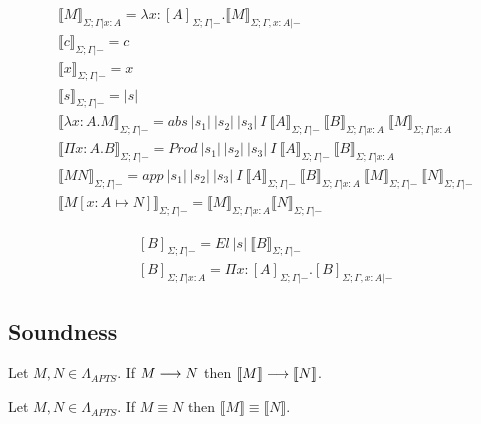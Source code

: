 \documentclass[]{StandardTemplate}
\begin{document}
\begin{align*}
  &\llbracket M \rrbracket_{\Sigma; \Gamma |x : A} = \lambda x : [ A ]_{\Sigma; \Gamma |-}. \llbracket M \rrbracket_{\Sigma; \Gamma, x : A |-}\\
  &\llbracket c \rrbracket_{\Sigma; \Gamma |-} = c\\
  &\llbracket x \rrbracket_{\Sigma; \Gamma |-} = x\\
  &\llbracket s \rrbracket_{\Sigma; \Gamma |-} = |s|\\
  &\llbracket \lambda x : A. M \rrbracket_{\Sigma; \Gamma |-} = abs~|s_1|~|s_2|~|s_3|~I~\llbracket A \rrbracket_{\Sigma; \Gamma |-}~\llbracket B \rrbracket_{\Sigma; \Gamma |x : A}~\llbracket M \rrbracket_{\Sigma; \Gamma |x : A}\\
  &\llbracket \Pi x : A. B \rrbracket_{\Sigma; \Gamma |-} = Prod~|s_1|~|s_2|~|s_3|~I~\llbracket A \rrbracket_{\Sigma; \Gamma |-}~\llbracket B \rrbracket_{\Sigma; \Gamma |x:A}\\
  &\llbracket M N \rrbracket_{\Sigma; \Gamma |-} = app~|s_1|~|s_2|~|s_3|~I~\llbracket A \rrbracket_{\Sigma; \Gamma |-}~\llbracket B \rrbracket_{\Sigma; \Gamma |x : A}~\llbracket M \rrbracket_{\Sigma; \Gamma |-}~\llbracket N \rrbracket_{\Sigma; \Gamma |-}\\
  &\llbracket M[x : A \mapsto N]\rrbracket_{\Sigma; \Gamma |-} = \llbracket M \rrbracket_{\Sigma; \Gamma |x : A}\llbracket N \rrbracket_{\Sigma; \Gamma |-}
\end{align*}

\begin{align*}
  &[B]_{\Sigma; \Gamma |-} = El~|s|~\llbracket B \rrbracket_{\Sigma; \Gamma |-}\\
  &[B]_{\Sigma; \Gamma | x : A} = \Pi x : [ A ]_{\Sigma; \Gamma |-}. [ B ]_{\Sigma; \Gamma, x : A |-}
\end{align*}

\subsection{Soundness}
\label{subsec:sound}

\begin{lem}[]
Let $ M, N \in \Lambda_{APTS} $. If $ M \longrightarrow N $ then $ \llbracket M \rrbracket \longrightarrow \llbracket N \rrbracket $.
\end{lem}

\begin{cor}[]
Let $ M, N \in \Lambda_{APTS} $. If $ M \equiv N $ then $ \llbracket M \rrbracket \equiv \llbracket N \rrbracket $.
\end{cor}
\end{document}
